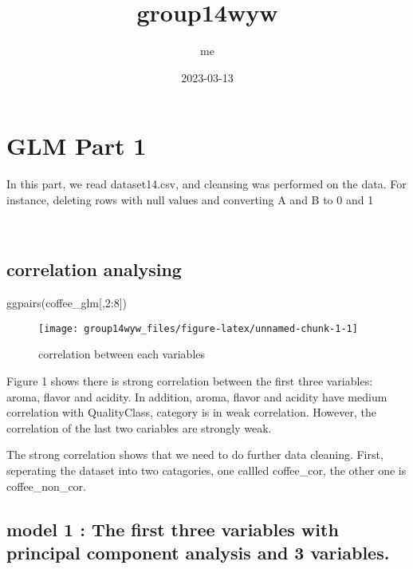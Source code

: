 \documentclass[
]{article}
\title{group14wyw}
\author{me}
\date{2023-03-13}
\newenvironment{Shaded}{\begin{snugshade}}{\end{snugshade}}
\newcommand{\DecValTok}[1]{\textcolor[rgb]{0.00,0.00,0.81}{#1}}
\newcommand{\FunctionTok}[1]{\textcolor[rgb]{0.00,0.00,0.00}{#1}}
\newcommand{\NormalTok}[1]{#1}
\newcommand{\SpecialCharTok}[1]{\textcolor[rgb]{0.00,0.00,0.00}{#1}}
\begin{document}
\maketitle

\hypertarget{glm-part-1}{%
\section{GLM Part 1}\label{glm-part-1}}

In this part, we read dataset14.csv, and cleansing was performed on the
data. For instance, deleting rows with null values and converting A and
B to 0 and 1

~

\hypertarget{correlation-analysing}{%
\subsection{correlation analysing}\label{correlation-analysing}}

\begin{Shaded}
\begin{Highlighting}[]
\FunctionTok{ggpairs}\NormalTok{(coffee\_glm[,}\DecValTok{2}\SpecialCharTok{:}\DecValTok{8}\NormalTok{])}
\end{Highlighting}
\end{Shaded}

\begin{figure}[H]

{\centering \texttt{[image: group14wyw\_files/figure-latex/unnamed-chunk-1-1]} 

}

\caption{\label{fig:scat} correlation between each variables}\label{fig:unnamed-chunk-1}
\end{figure}

Figure 1 shows there is strong correlation between the first three
variables: aroma, flavor and acidity. In addition, aroma, flavor and
acidity have medium correlation with QualityClass, category is in weak
correlation. However, the correlation of the last two cariables are
strongly weak.

The strong correlation shows that we need to do further data cleaning.
First, seperating the dataset into two catagories, one callled
coffee\_cor, the other one is coffee\_non\_cor.

\hypertarget{model-1-the-first-three-variables-with-principal-component-analysis-and-3-variables.}{%
\subsection{model 1 : The first three variables with principal component
analysis and 3
variables.}\label{model-1-the-first-three-variables-with-principal-component-analysis-and-3-variables.}}
\end{document}
